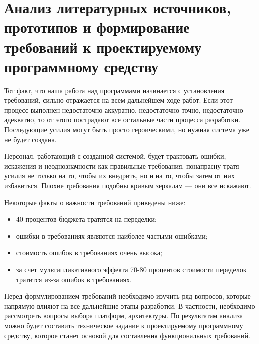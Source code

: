 \section{Анализ литературных источников, прототипов и формирование требований к проектируемому программному средству}
\label{sec:analysis}

Тот факт, что наша работа над программами начинается с установления требований, сильно отражается на всем дальнейшем ходе работ. Если этот процесс выполнен недостаточно аккуратно, недостаточно точно, недостаточно адекватно, то от этого пострадают все остальные части процесса разработки. Последующие усилия могут быть просто героическими, но нужная система уже не будет создана.

Персонал, работающий с созданной системой, будет трактовать ошибки, искажения и неоднозначности как правильные требования, понапрасну тратя усилия не только на то, чтобы их внедрить, но и на то, чтобы затем от них избавиться. Плохие требования подобны кривым зеркалам — они все искажают.

Некоторые факты о важности требований приведены ниже:
\begin{itemize}
	\item 40 процентов бюджета тратятся на переделки;
	\item ошибки в требованиях являются наиболее частыми ошибками;
	\item стоимость ошибок в требованиях очень высока;
	\item за счет мультипликативного эффекта 70-80 процентов стоимости переделок тратится из-за ошибок в требованиях.
\end{itemize}

Перед формулированием требований необходимо изучить ряд вопросов, которые напрямую влияют на все дальнейшие этапы разработки. В частности, необходимо рассмотреть вопросы выбора платформ, архитектуры. По результатам анализа можно будет составить техническое задание к проектируемому программному средству, которое станет основой для составления функциональных требований.





